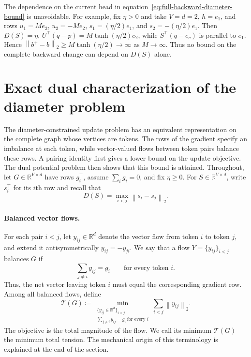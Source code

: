 \documentclass[anon]{opt2026} %
\newcommand{\R}{\mathbb{R}}
\newcommand{\norm}[1]{\left\lVert #1\right\rVert}
\begin{document}
The dependence on the current head in
equation~\ref{eq:full-backward-diameter-bound} is unavoidable. For example, fix
$\eta>0$ and take $V=d=2$, $h=e_1$, and rows
$u_1=Me_2$, $u_2=-Me_2$, $s_1=(\eta/2)e_1$, and
$s_2=-(\eta/2)e_1$. Then $D(S)=\eta$,
$U^\top(q-p)=M\tanh(\eta/2)e_2$, while
$S^\top(q-e_c)$ is parallel to $e_1$. Hence
$\norm{b^+-b}_2\geq M\tanh(\eta/2)\to\infty$ as $M\to\infty$.
Thus no bound on the complete backward change can depend on $D(S)$ alone.


\section{Exact dual characterization of the diameter problem}
\label{app:diameter-duality}

The diameter-constrained update problem has an equivalent representation on the complete graph whose vertices are tokens. The rows of the gradient specify an imbalance at each token, while vector-valued flows between token pairs balance these rows. A pairing identity first gives a lower bound on the update objective. The dual potential problem then shows that this bound is attained. Throughout, let $G\in\R^{V\times d}$ have rows $g_i^\top$, assume $\sum_i g_i=0$, and fix $\eta\geq0$. For $S\in\R^{V\times d}$, write
$s_i^\top$ for its $i$th row and recall that
\[
D(S)=\max_{i<j}\norm{s_i-s_j}_2.
\]


\paragraph{Balanced vector flows.}
For each pair $i<j$, let $y_{ij}\in\R^d$ denote the vector flow from token $i$ to token $j$, and extend it antisymmetrically $y_{ij} = -y_{ji}$. We say that a flow $Y=\{y_{ij}\}_{i<j}$ balances $G$ if
\[
\sum_{j\neq i}y_{ij}=g_i
\qquad\text{for every token }i.
\]
Thus, the net vector leaving token $i$ must equal the corresponding gradient
row. Among all balanced flows, define
\begin{equation}
\boxed{
\mathcal T(G)
\coloneqq
\min_{\substack{\{y_{ij}\in\R^d\}_{i<j}\\
                 \sum_{j\neq i}y_{ij}=g_i\ \text{for every }i}}
\sum_{i<j}\norm{y_{ij}}_2 .
}
\label{eq:minimum-tension}
\end{equation}
The objective is the total magnitude of the flow. We call its minimum $\mathcal T(G)$ the minimum total tension. The mechanical origin of this terminology is explained at the end of the section.
\end{document}
